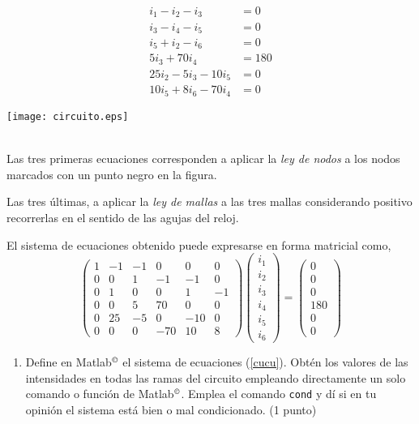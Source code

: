 \begin{enumerate}
\begin{minipage}{0.3\textwidth}
\begin{align*}
i_1 - i_2 - i_3 &= 0\\
i_3 - i_4 - i_5 &= 0\\
i_5  + i_2 -i_6&= 0\\
5i_3 + 70 i_4 &= 180\\
25i_2 -5i_3-10i_5 &= 0\\
10i_5+8i_6 -70i_4 &= 0  
\end{align*}
\end{minipage}
\begin{minipage}{0.7\textwidth}
\texttt{[image: circuito.eps]}
\end{minipage}
\ \\
Las tres primeras ecuaciones corresponden a aplicar la \emph{ley de nodos} a los nodos marcados con un punto negro en la figura. 

Las tres últimas, a aplicar la \emph{ley de mallas} a las tres mallas considerando positivo recorrerlas en el sentido de las agujas del reloj.

El sistema de ecuaciones obtenido puede expresarse en forma matricial como,
\begin{equation}\label{cucu}
\begin{pmatrix}
1& -1& -1& 0 & 0 &0\\
0& 0& 1& -1& -1& 0\\
0& 1& 0&  0&  1& -1\\ 
0& 0& 5& 70& 0& 0\\
0& 25& -5& 0& -10& 0\\
0& 0& 0& -70& 10& 8
\end{pmatrix}\begin{pmatrix}
i_1\\ i_2\\ i_3\\ i_4\\ i_5\\ i_6
\end{pmatrix}= \begin{pmatrix}
0\\ 0\\ 0\\ 180\\ 0\\ 0
\end{pmatrix} 
\end{equation}



\begin{enumerate}
\item Define en Matlab{$^\copyright$} el sistema de ecuaciones (\ref{cucu}). Obtén los valores de las intensidades en todas las ramas del circuito empleando directamente un solo comando o función de Matlab{$^\copyright$}. Emplea el comando \texttt{cond} y dí si en tu opinión el sistema está bien o mal condicionado. (1 punto)


\end{enumerate}
\end{enumerate}
